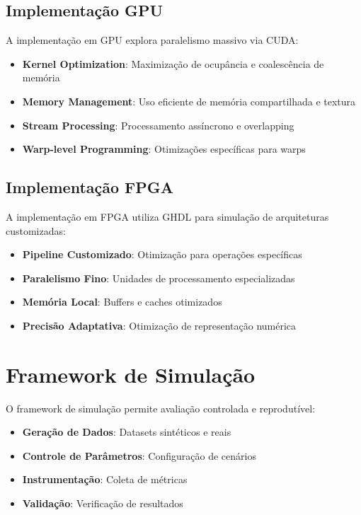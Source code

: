 \subsection{Implementação GPU}
A implementação em GPU explora paralelismo massivo via CUDA:

\begin{itemize}
    \item \textbf{Kernel Optimization}: Maximização de ocupância e coalescência de memória
    \item \textbf{Memory Management}: Uso eficiente de memória compartilhada e textura
    \item \textbf{Stream Processing}: Processamento assíncrono e overlapping
    \item \textbf{Warp-level Programming}: Otimizações específicas para warps
\end{itemize}

\subsection{Implementação FPGA}
A implementação em FPGA utiliza GHDL para simulação de arquiteturas customizadas:

\begin{itemize}
    \item \textbf{Pipeline Customizado}: Otimização para operações específicas
    \item \textbf{Paralelismo Fino}: Unidades de processamento especializadas
    \item \textbf{Memória Local}: Buffers e caches otimizados
    \item \textbf{Precisão Adaptativa}: Otimização de representação numérica
\end{itemize}

\section{Framework de Simulação}\label{sec:simulacao}

O framework de simulação permite avaliação controlada e reprodutível:

\begin{itemize}
    \item \textbf{Geração de Dados}: Datasets sintéticos e reais
    \item \textbf{Controle de Parâmetros}: Configuração de cenários
    \item \textbf{Instrumentação}: Coleta de métricas
    \item \textbf{Validação}: Verificação de resultados
\end{itemize}

